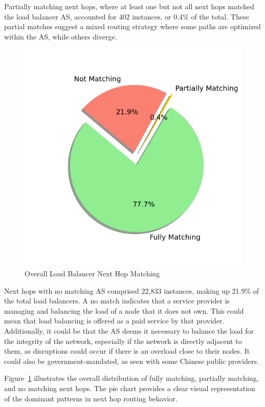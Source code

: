 \documentclass[12pt]{cwru_thesis}
\begin{document}
Partially matching next hops, where at least one but not all next hops matched the load balancer AS, accounted for 402 instances, or 0.4\% of the total. These partial matches suggest a mixed routing strategy where some paths are optimized within the AS, while others diverge.
\begin{figure}[h!]
    \centering
    \includegraphics[scale=0.6]{figures/overall_match_mismatch.png}
    \caption{Overall Load Balancer Next Hop Matching}
    \label{fig:overall_match_mismatch}
\end{figure}


Next hops with no matching AS comprised 22,833 instances, making up 21.9\% of the total load balancers. A no match indicates that a service provider is managing and balancing the load of a node that it does not own. This could mean that load balancing is offered as a paid service by that provider. Additionally, it could be that the AS deems it necessary to balance the load for the integrity of the network, especially if the network is directly adjacent to them, as disruptions could occur if there is an overload close to their nodes. It could also be government-mandated, as seen with some Chinese public providers.

Figure~\ref{fig:overall_match_mismatch} illustrates the overall distribution of fully matching, partially matching, and no matching next hops. The pie chart provides a clear visual representation of the dominant patterns in next hop routing behavior.
\end{document}
